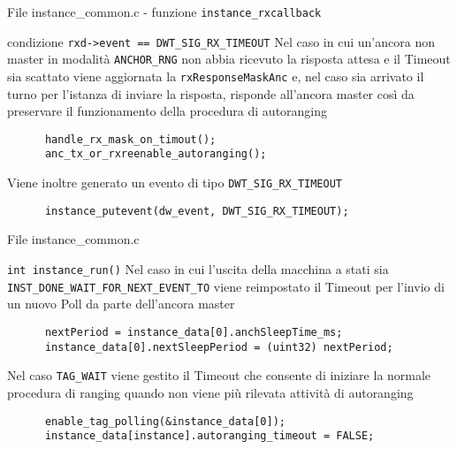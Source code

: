 \begin{frame}[fragile]{File instance\_common.c - funzione \lstinline!instance_rxcallback!}
  \begin{block}{condizione \lstinline!rxd->event == DWT_SIG_RX_TIMEOUT!}
    Nel caso in cui un'ancora \alert{non} master in modalità \lstinline!ANCHOR_RNG! non abbia ricevuto la risposta attesa e il Timeout sia scattato viene
    aggiornata la \lstinline!rxResponseMaskAnc! e, nel caso sia arrivato il turno per l'istanza di inviare la risposta, risponde all'ancora master così da preservare il funzionamento della procedura di autoranging
    \begin{lstlisting}
      handle_rx_mask_on_timout();
      anc_tx_or_rxreenable_autoranging();
    \end{lstlisting}
    Viene inoltre generato un evento di tipo \lstinline!DWT_SIG_RX_TIMEOUT!
    \begin{lstlisting}
      instance_putevent(dw_event, DWT_SIG_RX_TIMEOUT);
    \end{lstlisting}
  \end{block}
\end{frame}

\begin{frame}[fragile]{File instance\_common.c}
  \begin{block}{\lstinline!int instance_run()!}
    Nel caso in cui l'uscita della macchina a stati sia \lstinline!INST_DONE_WAIT_FOR_NEXT_EVENT_TO! viene reimpostato il Timeout per l'invio di un nuovo Poll
    da parte dell'ancora \alert{master}
    \begin{lstlisting}
      nextPeriod = instance_data[0].anchSleepTime_ms;
      instance_data[0].nextSleepPeriod = (uint32) nextPeriod;
    \end{lstlisting}
    Nel caso \lstinline!TAG_WAIT! viene gestito il Timeout che consente di iniziare la normale procedura di ranging quando
    non viene più rilevata attività di autoranging
    \begin{lstlisting}
      enable_tag_polling(&instance_data[0]);
      instance_data[instance].autoranging_timeout = FALSE;
    \end{lstlisting}
  \end{block}
\end{frame}


    
